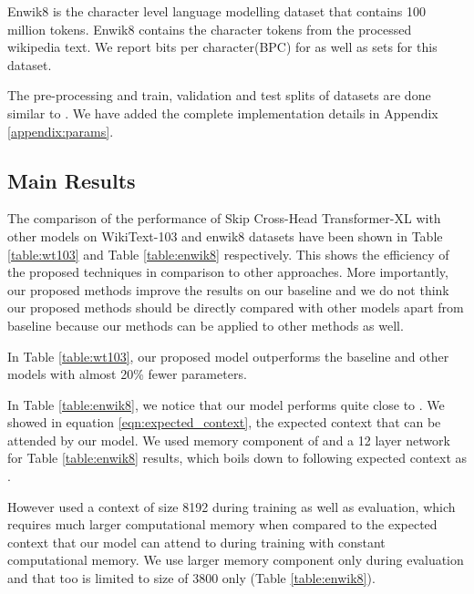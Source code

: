 \documentclass[11pt]{article}
\begin{document}
Enwik8 is the character level language modelling dataset that contains 100 million tokens. Enwik8 contains the character tokens from the processed wikipedia text.  We report bits per character(BPC) for  as well as  sets for this dataset.

The pre-processing and train, validation and test splits of datasets are done similar to \citet{DBLP:conf/acl/DaiYYCLS19}. We have added the complete implementation details in Appendix \ref{appendix:params}.


\subsection{Main Results}

The comparison of the performance of Skip Cross-Head Transformer-XL with other models on WikiText-103 and enwik8 datasets have been shown in Table \ref{table:wt103} and Table \ref{table:enwik8} respectively. This shows the efficiency of the proposed techniques in comparison to other approaches. More importantly, our proposed methods improve the results on our baseline and we do not think our proposed methods should be directly compared with other models apart from baseline because our methods can be applied to other methods as well.

In Table \ref{table:wt103}, our proposed model outperforms the baseline and other models with almost 20\% fewer parameters.

In Table \ref{table:enwik8}, we notice that our model performs quite close to \citep{DBLP:conf/acl/SukhbaatarGBJ19}. We showed in equation \ref{eqn:expected_context}, the expected context that can be attended by our model. We used memory component of  and a 12 layer network for Table \ref{table:enwik8} results, which boils down to following expected context as
.

However \citep{DBLP:conf/acl/SukhbaatarGBJ19} used a context of size 8192 during training as well as evaluation, which requires much larger computational memory when compared to the expected context that our model can attend to during training with constant computational memory. We use larger memory component only during evaluation and that too is limited to size of 3800 only (Table \ref{table:enwik8}).
\end{document}
